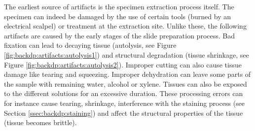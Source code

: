 The earliest source of artifacts is the specimen extraction process itself. The specimen can indeed be damaged by the use of certain tools (\eg burned by an electrical scalpel) or treatment at the extraction site. Unlike these, the following artifacts are caused by the early stages of the slide preparation process. Bad fixation can lead to decaying tissue (\ie autolysis, see Figure \ref{fig:backdp:artifacts:autolysis1}) and structural degradation (\eg tissue shrinkage, see Figure \ref{fig:backdp:artifacts:autolysis2}). Improper cutting can also cause tissue damage like tearing and squeezing. Improper dehydration can leave some parts of the sample with remaining water, alcohol or xylene. Tissues can also be exposed to the different solutions for an excessive duration. These processing errors can for instance cause tearing, shrinkage, interference with the staining process (see Section \ref{ssec:backdp:staining}) and affect the structural properties of the tissue (\eg tissue becomes brittle).

